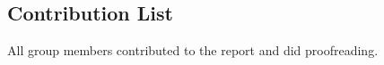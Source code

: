 \subsection{Contribution List}
All group members contributed to the report and did proofreading.\\\newline





\newpage